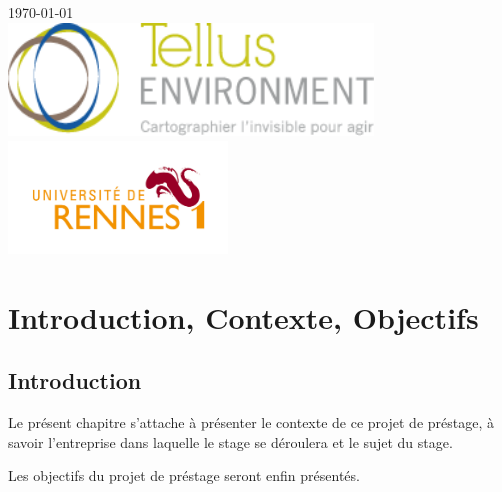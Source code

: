 \documentclass[12pt,a4paper]{report}
\begin{document}
\begin{titlepage}

{\large \today}\\[1cm] %

\includegraphics[height=3cm]{img/logo-tellusenv.png} \\
\includegraphics[height=3cm]{img/univ.jpeg}\\[1cm] %
 

\vfill %

\end{titlepage}

\tableofcontents
\part{Introduction, Contexte, Objectifs}

\chapter{Introduction}

Le présent chapitre s'attache à présenter le contexte de ce projet de préstage, à savoir l'entreprise dans laquelle le stage se déroulera et le sujet du stage.

Les objectifs du projet de préstage seront enfin présentés.
\end{document}
